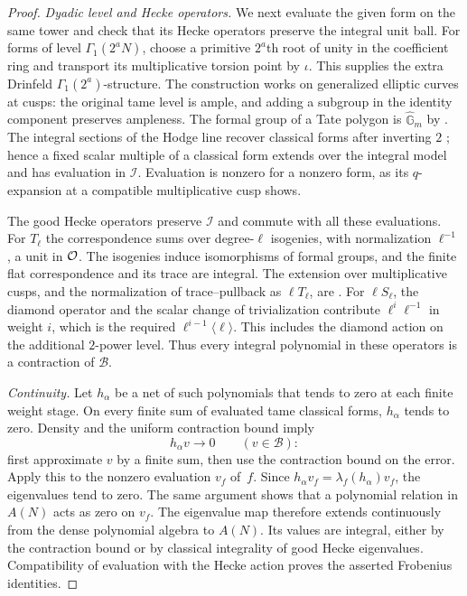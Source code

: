 \begin{proof}
\emph{Dyadic level and Hecke operators.} We next evaluate the given form on the same tower and check
that its Hecke operators preserve the integral unit ball.
For forms of level $\Gamma_1(2^aN)$, choose a primitive $2^a$th root of unity in the coefficient ring
and transport its multiplicative torsion point by $\iota$.
This supplies the extra Drinfeld $\Gamma_1(2^a)$-structure.
The construction works on generalized elliptic curves at cusps:
the original tame level is ample, and adding a subgroup in the
identity component preserves ampleness.  The formal group of a
Tate polygon is $\widehat{\mathbb G}_m$ by
\cite[Equation~(2.5.3)]{Conrad2007}.  The integral sections of the
Hodge line recover classical forms after inverting $2$
\cite[Section~4.4, Equation~(4.4.2)]{Conrad2007}; hence a fixed
scalar multiple of a classical form extends over the integral
model and has evaluation in $\mathcal I$.  Evaluation is nonzero for a
nonzero form, as its $q$-expansion at a compatible multiplicative
cusp shows.

The good Hecke operators preserve $\mathcal I$ and commute with
all these evaluations.  For $T_\ell$ the correspondence sums over
degree-$\ell$ isogenies, with normalization $\ell^{-1}$, a unit
in $\mathcal O$.  The isogenies induce isomorphisms of formal groups,
and the finite flat correspondence and its trace are integral.
The extension over multiplicative cusps, and the normalization
of trace--pullback as $\ell T_\ell$, are
\cite[Theorem~4.4.3 and Equation~(4.5.1)]{Conrad2007}.
For $\ell S_\ell$, the diamond operator and the scalar change
of trivialization contribute $\ell^i\ell^{-1}$ in weight $i$,
which is the required $\ell^{i-1}\langle\ell\rangle$.
This includes the diamond action on the additional $2$-power
level.  Thus every integral polynomial in these operators is
a contraction of $\mathcal B$.

\emph{Continuity.} Let $h_\alpha$ be a net of such polynomials
that tends to zero at each finite weight stage.  On every finite
sum of evaluated tame classical forms, $h_\alpha$ tends to zero.
Density and the uniform contraction bound imply
\[
 h_\alpha v\longrightarrow0\qquad(v\in\mathcal B):
\]
first approximate $v$ by a finite sum, then use the contraction
bound on the error.  Apply this to the nonzero evaluation $v_f$
of~$f$.  Since $h_\alpha v_f=\lambda_f(h_\alpha)v_f$,
the eigenvalues tend to zero.  The same argument shows that a
polynomial relation in $A(N)$ acts as zero on $v_f$.
The eigenvalue map therefore extends continuously from the dense
polynomial algebra to $A(N)$.  Its values are integral, either
by the contraction bound or by classical integrality of good
Hecke eigenvalues.  Compatibility of evaluation with the Hecke
action proves the asserted Frobenius identities.
\end{proof}

